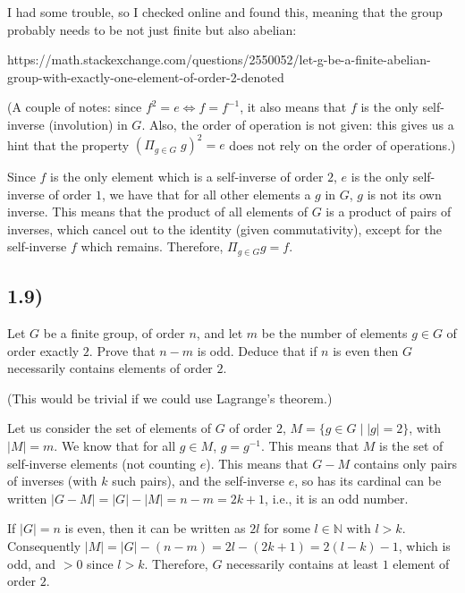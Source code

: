 
I had some trouble, so I checked online and found this, meaning that the group probably needs to be not just finite but also abelian:

https://math.stackexchange.com/questions/2550052/let-g-be-a-finite-abelian-group-with-exactly-one-element-of-order-2-denoted

(A couple of notes: since $f^2 = e \Leftrightarrow f = f^{-1}$, it also means that $f$ is the only self-inverse (involution) in $G$. Also, the order of operation is not given: this gives us a hint that the property $(\Pi_{g \in G} \; g)^2 = e$ does not rely on the order of operations.)

Since $f$ is the only element which is a self-inverse of order $2$, $e$ is the only self-inverse of order $1$, we have that for all other elements a $g$ in $G$, $g$ is not its own inverse. This means that the product of all elements of $G$ is a product of pairs of inverses, which cancel out to the identity (given commutativity), except for the self-inverse $f$ which remains. Therefore, $\Pi_{g \in G} g = f$.



\subsection*{1.9)}

Let $G$ be a finite group, of order $n$, and let $m$ be the number of elements $g \in G$ of order exactly $2$. Prove that $n - m$ is odd. Deduce that if $n$ is even then $G$ necessarily contains elements of order $2$.

(This would be trivial if we could use Lagrange's theorem.)

Let us consider the set of elements of $G$ of order $2$, $M = \{ g \in G \mid |g| = 2 \}$, with $|M| = m$. We know that for all $g \in M$, $g = g^{-1}$. This means that $M$ is the set of self-inverse elements (not counting $e$). This means that $G - M$ contains only pairs of inverses (with $k$ such pairs), and the self-inverse $e$, so has its cardinal can be written $|G - M| = |G| - |M| = n - m = 2k + 1$, i.e., it is an odd number.

If $|G| = n$ is even, then it can be written as $2l$ for some $l \in \mathbb{N}$ with $l > k$. Consequently $|M| = |G| - (n - m) = 2l - (2k + 1) = 2(l - k) - 1$, which is odd, and $> 0$ since $l > k$. Therefore, $G$ necessarily contains at least $1$ element of order $2$.



